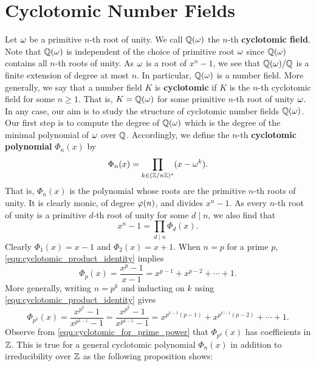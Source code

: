   \section{Cyclotomic Number Fields}
    Let $\omega$ be a primitive $n$-th root of unity. We call $\mathbb{Q}(\omega)$ the $n$-th \textbf{cyclotomic field}. Note that $\mathbb{Q}(\omega)$ is independent of the choice of primitive root $\omega$ since $\mathbb{Q}(\omega)$ contains all $n$-th roots of unity. As $\omega$ is a root of $x^{n}-1$, we see that $\mathbb{Q}(\omega)/\mathbb{Q}$ is a finite extension of degree at most $n$. In particular, $\mathbb{Q}(\omega)$ is a number field. More generally, we say that a number field $K$ is \textbf{cyclotomic} if $K$ is the $n$-th cyclotomic field for some $n \ge 1$. That is, $K = \mathbb{Q}(\omega)$ for some primitive $n$-th root of unity $\omega$. In any case, our aim is to study the structure of cyclotomic number fields $\mathbb{Q}(\omega)$. Our first step is to compute the degree of $\mathbb{Q}(\omega)$ which is the degree of the minimal polynomial of $\omega$ over $\mathbb{Q}$. Accordingly, we define the $n$-th \textbf{cyclotomic polynomial} $\Phi_{n}(x)$ by
    \[
      \Phi_{n}(x) = \prod_{k \in (\mathbb{Z}/n\mathbb{Z})^{\ast}}(x-\omega^{k}).
    \]
    That is, $\Phi_{n}(x)$ is the polynomial whose roots are the primitive $n$-th roots of unity. It is clearly monic, of degree $\varphi(n)$, and divides $x^{n}-1$. As every $n$-th root of unity is a primitive $d$-th root of unity for some $d \mid n$, we also find that
    \begin{equation}\label{equ:cyclotomic_product_identity}
      x^{n}-1 = \prod_{d \mid n}\Phi_{d}(x).
    \end{equation}
    Clearly $\Phi_{1}(x) = x-1$ and $\Phi_{2}(x) = x+1$. When $n = p$ for a prime $p$, \cref{equ:cyclotomic_product_identity} implies
    \[
      \Phi_{p}(x) = \frac{x^{p}-1}{x-1} = x^{p-1}+x^{p-2}+\cdots+1.
    \]
    More generally, writing $n = p^{k}$ and inducting on $k$ using \cref{equ:cyclotomic_product_identity} gives
    \begin{equation}\label{equ:cyclotomic_for_prime_power}
      \Phi_{p^{k}}(x) = \frac{x^{p^{k}}-1}{x^{p^{k-1}}-1} = \frac{x^{p^{k}}-1}{x^{p^{k-1}}-1} = x^{p^{k-1}(p-1)}+x^{p^{k-1}(p-2)}+\cdots+1.
    \end{equation}
    Observe from \cref{equ:cyclotomic_for_prime_power} that $\Phi_{p^{k}}(x)$ has coefficients in $\mathbb{Z}$. This is true for a general cyclotomic polynomial $\Phi_{n}(x)$ in addition to irreducibility over $\mathbb{Z}$ as the following proposition shows:


